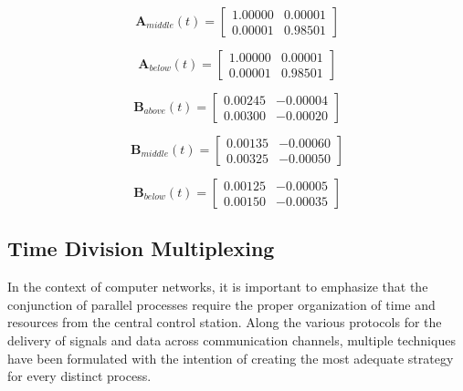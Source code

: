 \documentclass[12pt]{article}
\begin{document}
\begin{equation}
\label{eqn:6}
\mathbf{A}_{middle}(t) = 
\begin{bmatrix}
1.00000 & 0.00001 \\
0.00001 & 0.98501
\end{bmatrix}
\end{equation}

\begin{equation}
\label{eqn:7}
\mathbf{A}_{below}(t) = 
\begin{bmatrix}
1.00000 & 0.00001 \\
0.00001 & 0.98501
\end{bmatrix}
\end{equation}

\begin{equation}
\label{eqn:8}
\mathbf{B}_{above}(t) = 
\begin{bmatrix}
0.00245 & -0.00004 \\
0.00300 & -0.00020
\end{bmatrix}
\end{equation}

\begin{equation}
\label{eqn:9}
\mathbf{B}_{middle}(t) = 
\begin{bmatrix}
0.00135 & -0.00060 \\
0.00325 & -0.00050
\end{bmatrix}
\end{equation}

\begin{equation}
\label{eqn:10}
\mathbf{B}_{below}(t) = 
\begin{bmatrix}
0.00125 & -0.00005 \\
0.00150 & -0.00035
\end{bmatrix}
\end{equation}

\subsection{Time Division Multiplexing}

In the context of computer networks, it is important to emphasize that the conjunction of parallel processes require the proper organization of time and resources from the central control station. Along the various protocols for the delivery of signals and data across communication channels, multiple techniques have been formulated with the intention of creating the most adequate strategy for every distinct process.
\end{document}
